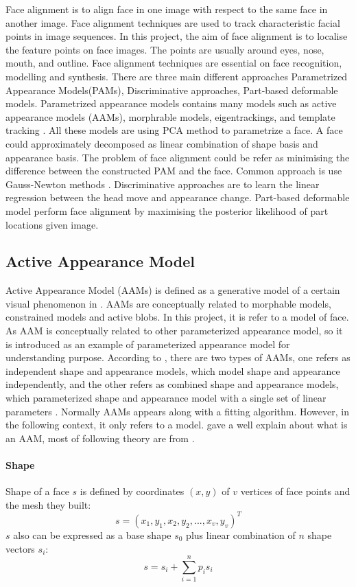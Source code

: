 Face alignment is to align face in one image with respect to the same face in another image. Face alignment techniques are used to track characteristic facial points in image sequences. In this project, the aim of face alignment is to localise the feature points on face images. The points are usually around eyes, nose, mouth, and outline. Face alignment techniques are essential on face recognition, modelling and synthesis. There are three main different approaches Parametrized Appearance Models(PAMs), Discriminative approaches, Part-based deformable models. Parametrized appearance models contains many models such as active appearance models (AAMs), morphrable models, eigentrackings, and template tracking \cite{xiong2013supervised}. All these models are using PCA method to parametrize a face. A face could approximately decomposed as linear combination of shape basis and appearance basis. The problem of face alignment could be refer as minimising the difference between the constructed PAM and the face. Common approach is use Gauss-Newton methods \cite{xiong2013supervised}. Discriminative approaches are to learn the linear regression between the head move and appearance change. Part-based deformable model perform face alignment by maximising the posterior likelihood of part locations given image\cite{xiong2013supervised}.

\subsection{Active Appearance Model}
Active Appearance Model (AAMs) is defined as a generative model of a certain visual phenomenon in \cite{matthews2004active}. AAMs are conceptually related to morphable models, constrained models and active blobs. In this project, it is refer to a model of face. As AAM is conceptually related to other parameterized appearance model, so it is introduced as an example of parameterized appearance model for understanding purpose. According to \cite{matthews2004active}, there are two types of AAMs, one refers as independent shape and appearance models, which model shape and appearance independently, and the other refers as combined shape and appearance models, which parameterized shape and appearance model with a single set of linear parameters \cite{matthews2004active}. Normally AAMs appears along with a fitting algorithm. However, in the following context, it only refers to a model.\cite{matthews2004active} gave a well explain about what is an AAM, most of following theory are from \cite{matthews2004active}.
\paragraph{Shape}
Shape of a face $s$ is defined by coordinates $(x,y)$ of $v$ vertices of face points and the mesh they built:
\begin{equation}
s = (x_{1},y_{1},x_{2},y_{2},...,x_{v},y_{v})^{T}
\end{equation}
\newline
$s$ also can be expressed as a base shape $s_{0}$ plus linear combination of $n$ shape vectors $s_{i}$:
\begin{equation}
s = s_{i} + \sum_{i =1}^{n}p_{i}s_{i}
\end{equation}
